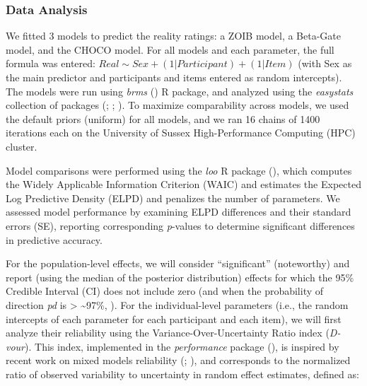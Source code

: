 \documentclass[
  jou,
  floatsintext,
  longtable,
  nolmodern,
  notxfonts,
  notimes,
  colorlinks=true,linkcolor=blue,citecolor=blue,urlcolor=blue]{apa7}
\begin{document}
\subsubsection{Data Analysis}\label{data-analysis}

We fitted 3 models to predict the reality ratings: a ZOIB model, a
Beta-Gate model, and the CHOCO model. For all models and each parameter,
the full formula was entered:
\(Real\sim Sex + (1 | Participant) + (1 | Item)\) (with Sex as the main
predictor and participants and items entered as random intercepts). The
models were run using \emph{brms}
() R package, and analyzed
using the \emph{easystats} collection of packages
(;
; ). To
maximize comparability across models, we used the default priors
(uniform) for all models, and we ran 16 chains of 1400 iterations each
on the University of Sussex High-Performance Computing (HPC) cluster.

Model comparisons were performed using the \emph{loo} R package
(), which
computes the Widely Applicable Information Criterion (WAIC) and
estimates the Expected Log Predictive Density (ELPD) and penalizes the
number of parameters. We assessed model performance by examining ELPD
differences and their standard errors (SE), reporting corresponding
\emph{p}-values to determine significant differences in predictive
accuracy.

For the population-level effects, we will consider ``significant''
(noteworthy) and report (using the median of the posterior distribution)
effects for which the 95\% Credible Interval (CI) does not include zero
(and when the probability of direction \emph{pd} is \textgreater{}
\textasciitilde97\%, ). For the individual-level parameters (i.e.,
the random intercepts of each parameter for each participant and each
item), we will first analyze their reliability using the
Variance-Over-Uncertainty Ratio index (\emph{D-vour}). This index,
implemented in the \emph{performance} package
(), is
inspired by recent work on mixed models reliability
(;
), and
corresponds to the normalized ratio of observed variability to
uncertainty in random effect estimates, defined as:
\end{document}
